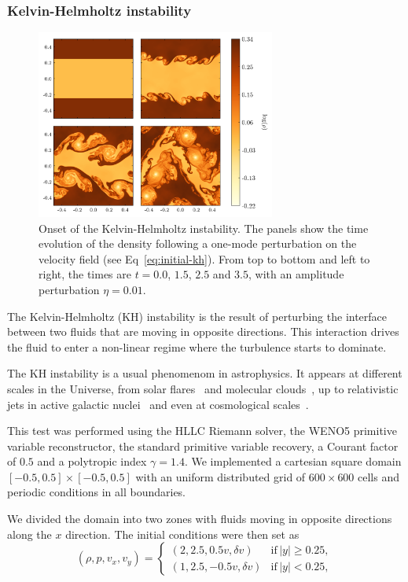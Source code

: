 \subsubsection{Kelvin-Helmholtz instability}
\label{subsubsec:kh}
\begin{figure}
    \centering
    \includegraphics[width=0.70\textwidth]{Figures/kelvin-helmholtz.png}
    \caption{Onset of the Kelvin-Helmholtz instability. The panels show the time evolution of the density following a one-mode perturbation on the velocity field (see Eq~\ref{eq:initial-kh}). From top to bottom and left to right, the times are $t = 0.0$, $1.5$, $2.5$ and $3.5$, with an amplitude perturbation $\eta = 0.01$.}
    \label{fig:kelvin-helmholtz}
\end{figure} 

The Kelvin-Helmholtz (KH) instability is the result of perturbing the interface between two fluids that are moving in opposite directions. This interaction drives the fluid to enter a non-linear regime where the turbulence starts to dominate.
 
The KH instability is a usual phenomenom in astrophysics. It appears at different scales in the Universe, from solar flares~\citep{ruan2018} and molecular clouds~\citep{pandey2019}, up to relativistic jets in active galactic nuclei~\citep{perucho2006} and even at cosmological scales~\citep{malik2003}.
 
This test was performed using the HLLC Riemann solver, the WENO5 primitive variable reconstructor, the standard primitive variable recovery, a Courant factor of $0.5$ and a polytropic index $\gamma = 1.4$. We implemented a cartesian square domain $[-0.5,0.5]\times[-0.5,0.5]$ with an uniform distributed grid of $600\times600$ cells and periodic conditions in all boundaries.
 
We divided the domain into two zones with fluids moving in opposite directions along the $x$ direction. The initial conditions were then set as
 \begin{equation}
     \left( \rho, p, v_x, v_y \right) = \left\lbrace
     \begin{array}{cl}
        (2,2.5,0.5v,\delta v) & \mathrm{if}\, |y| \geq 0.25, \\
        (1,2.5,-0.5v,\delta v) &   \mathrm{if}\, |y| < 0.25,
     \end{array}
     \right.
     \label{eq:initial-kh}
 \end{equation}
 
